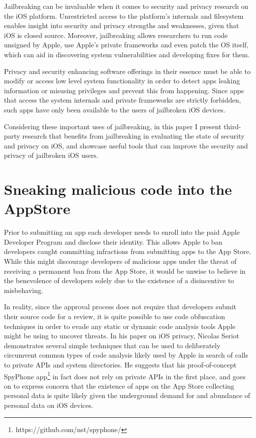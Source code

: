 \documentclass[12pt, titlepage, oneside]{article}
\newcommand{\tab}{\hspace*{2em}}
\begin{document}
Jailbreaking can be invaluable when it comes to security and privacy research on the iOS platform. Unrestricted access to the platform's internals and filesystem enables insight into security and privacy strengths and weaknesses, given that iOS is closed source. Moreover, jailbreaking allows researchers to run code unsigned by Apple, use Apple's private frameworks and even patch the OS itself, which can aid in discovering system vulnerabilities and developing fixes for them. 

Privacy and security enhancing software offerings in their essence must be able to modify or access low level system functionality in order to detect apps leaking information or misusing privileges and prevent this from happening. Since apps that access the system internals and private frameworks are strictly forbidden, such apps have only been available to the users of jailbroken iOS devices. 

Considering these important uses of jailbreaking, in this paper I present third-party research that benefits from jailbreaking in evaluating the state of security and privacy on iOS, and showcase useful tools that can improve the security and privacy of jailbroken iOS users.


\section{Sneaking malicious code into the AppStore}
\tab Prior to submitting an app each developer needs to enroll into the paid Apple Developer Program and disclose their identity. This allows Apple to ban developers caught committing infractions from submitting apps to the App Store. While this might discourage developers of malicious apps under the threat of receiving a permanent ban from the App Store, it would be unwise to believe in the benevolence of developers solely due to the existence of a disincentive to misbehaving. 

In reality, since the approval process does not require that developers submit their source code for a review, it is quite possible to use code obfuscation techniques in order to evade any static or dynamic code analysis tools Apple might be using to uncover threats.  In his paper on iOS privacy\cite{priv}, Nicolas Seriot demonstrates several simple techniques that can be used to deliberately circumvent common types of code analysis likely used by Apple in search of calls to private APIs and system directories. He suggests that his proof-of-concept SpyPhone app\footnote{https://github.com/nst/spyphone/} in fact does not rely on private APIs in the first place, and goes on to express concern that the existence of apps on the App Store collecting personal data is quite likely given the underground demand for and abundance of personal data on iOS devices.
\end{document}
